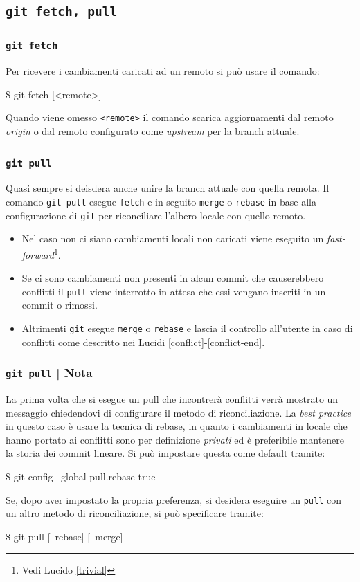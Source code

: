 \documentclass{beamer}
\begin{document}
\subsection{\texttt{git fetch, pull}}
\begin{frame}
  \frametitle{\texttt{git fetch}}
  Per ricevere i cambiamenti caricati ad un remoto si pu\`o usare il comando:
  \begin{semiverbatim}
  \$ git fetch [<remote>]
  \end{semiverbatim} \pause
  Quando viene omesso \texttt{<remote>} il comando scarica aggiornamenti dal
  remoto \emph{origin} o dal remoto configurato come \emph{upstream} per la
  branch attuale.
\end{frame}

\begin{frame}
  \frametitle{\texttt{git pull}}
  Quasi sempre si deisdera anche unire la branch attuale con quella remota.
  Il comando \texttt{git pull} esegue \texttt{fetch} e in seguito \texttt{merge}
  o \texttt{rebase} in base alla configurazione di \texttt{git} per riconciliare l'albero
  locale con quello remoto. \\ \pause
  \begin{itemize}
    \item Nel caso non ci siano cambiamenti locali non caricati viene eseguito
      un \emph{fast-forward}\footnote{Vedi Lucido \ref{trivial}}.
    \item Se ci sono cambiamenti non presenti in alcun commit che causerebbero
      conflitti il \texttt{pull} viene interrotto in attesa che essi vengano
      inseriti in un commit o rimossi.
    \item Altrimenti \texttt{git} esegue \texttt{merge} o \texttt{rebase} e lascia il
      controllo all'utente in caso di conflitti come descritto nei
      Lucidi \ref{conflict}-\ref{conflict-end}.
  \end{itemize}
\end{frame}

\begin{frame}
  \frametitle{\texttt{git pull} | Nota}
  La prima volta che si esegue un pull che incontrer\`a conflitti verr\`a
  mostrato un messaggio chiedendovi di configurare il metodo di riconciliazione.
  La \emph{best practice} in questo caso \`e usare la tecnica di rebase, in
  quanto i cambiamenti in locale che hanno portato ai conflitti sono per
  definizione \emph{privati} ed \`e preferibile mantenere la storia dei commit
  lineare. Si pu\`o impostare questa come default tramite:
  \begin{semiverbatim}
  \$ git config --global pull.rebase true
  \end{semiverbatim}
  \pause
  Se, dopo aver impostato la propria preferenza, si desidera eseguire un
  \texttt{pull} con un altro metodo di riconciliazione, si pu\`o specificare tramite:
  \begin{semiverbatim}
  \$ git pull [--rebase] [--merge]
  \end{semiverbatim}
\end{frame}
\end{document}
